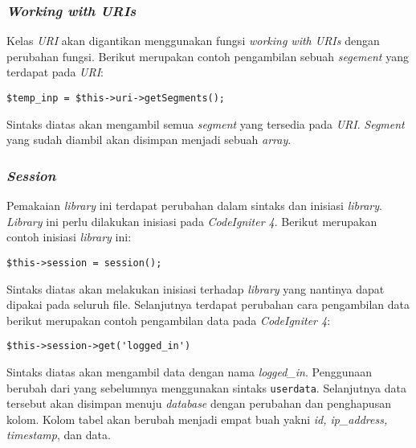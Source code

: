 \subsubsection{\textit{Working with URIs}}
Kelas \textit{URI} akan digantikan menggunakan fungsi \textit{working with URIs} dengan perubahan fungsi. Berikut merupakan contoh pengambilan sebuah \textit{segement} yang terdapat pada \textit{URI}:
\begin{center}
	\verb|$temp_inp = $this->uri->getSegments();|
\end{center}
Sintaks diatas akan mengambil semua \textit{segment} yang tersedia pada \textit{URI}. \textit{Segment} yang sudah diambil akan disimpan menjadi sebuah \textit{array}.

\subsubsection{\textit{Session}}
Pemakaian \textit{library} ini terdapat perubahan dalam sintaks dan inisiasi \textit{library}. \textit{Library} ini perlu dilakukan inisiasi pada \textit{CodeIgniter 4}. Berikut merupakan contoh inisiasi \textit{library} ini:
\begin{center}
	\verb|$this->session = session();|
\end{center}
Sintaks diatas akan melakukan inisiasi terhadap \textit{library} yang nantinya dapat dipakai pada seluruh file. Selanjutnya terdapat perubahan cara pengambilan data berikut merupakan contoh pengambilan data pada \textit{CodeIgniter 4}:
\begin{center}
	\verb|$this->session->get('logged_in')|
\end{center}
Sintaks diatas akan mengambil data dengan nama \textit{logged\_in}. Penggunaan berubah dari yang sebelumnya menggunakan sintaks \texttt{userdata}. Selanjutnya data tersebut akan disimpan menuju \textit{database} dengan perubahan dan penghapusan kolom. Kolom tabel akan berubah menjadi empat buah yakni \textit{id, ip\_address, timestamp}, dan data.

